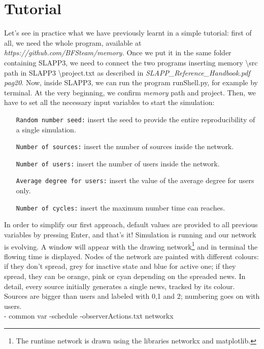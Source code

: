 \section{Tutorial}
Let's see in practice what we have previously learnt in a simple tutorial: first of all, we need the whole program, available at \textit{ https://github.com/BFSteam/memory.}
Once we put it in the same folder containing SLAPP3, we need to connect the two programs inserting memory \textbackslash src path in SLAPP3 \textbackslash project.txt as described in \textit{SLAPP\_Reference\_Handbook.pdf pag20}.
Now, inside SLAPP3, we can run the program runShell.py, for example by terminal.
At the very beginning, we confirm \textit{memory} path and project. Then, we have to set all the necessary input variables to start the simulation:
\begin{itemize}
\item[\texttt{Random number seed:}] insert the seed to provide the entire reproducibility of a single simulation.
\item[\texttt{Number of sources:}]insert the number of sources inside the network.
\item[\texttt{Number of users:}]insert the number of users inside the network.
\item[\texttt{Average degree for users:}]insert the value of the average degree for users only.
\item[\texttt{Number of cycles:}]insert the maximum number time can reaches.
\end{itemize}

In order to simplify our first approach, default values are provided to all previous variables by pressing Enter, and that's it!
Simulation is running and our network is evolving. A window will appear with the drawing network\footnote{The runtime network is drawn using the libraries networkx and matplotlib.} and in terminal the flowing time is displayed. 
Nodes of the network are painted with different colours: if they don't spread, grey for inactive state and blue for active one; if they spread, they can be orange, pink or cyan depending on the spreaded news. In detail, every source initially generates a single news, tracked by its colour. Sources are bigger than users and labeled with 0,1 and 2; numbering goes on with users.\\



- common var
-schedule
-observerActions.txt
networkx